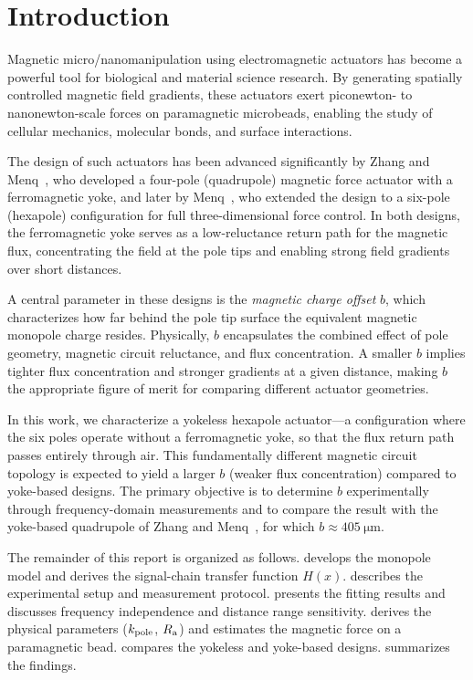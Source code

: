 \section{Introduction}
\label{sec:introduction}

Magnetic micro/nanomanipulation using electromagnetic actuators has become
a powerful tool for biological and material science research. By generating
spatially controlled magnetic field gradients, these actuators exert piconewton-
to nanonewton-scale forces on paramagnetic microbeads, enabling the study of
cellular mechanics, molecular bonds, and surface interactions.

The design of such actuators has been advanced significantly by
Zhang and Menq~\cite{Zhang2010}, who developed a four-pole (quadrupole)
magnetic force actuator with a ferromagnetic yoke, and later by
Menq~\cite{Menq2011}, who extended the design to a six-pole (hexapole)
configuration for full three-dimensional force control. In both designs,
the ferromagnetic yoke serves as a low-reluctance return path for the
magnetic flux, concentrating the field at the pole tips and enabling
strong field gradients over short distances.

A central parameter in these designs is the \emph{magnetic charge offset}
$b$, which characterizes how far behind the pole tip surface the equivalent
magnetic monopole charge resides. Physically, $b$ encapsulates the combined
effect of pole geometry, magnetic circuit reluctance, and flux concentration.
A smaller $b$ implies tighter flux concentration and stronger gradients at a
given distance, making $b$ the appropriate figure of merit for comparing
different actuator geometries.

In this work, we characterize a yokeless hexapole actuator---a configuration
where the six poles operate without a ferromagnetic yoke, so that the flux
return path passes entirely through air. This fundamentally different magnetic
circuit topology is expected to yield a larger $b$ (weaker flux concentration)
compared to yoke-based designs. The primary objective is to determine $b$
experimentally through frequency-domain measurements and to compare the
result with the yoke-based quadrupole of Zhang and Menq~\cite{Zhang2010},
for which $b \approx \SI{405}{\um}$.

The remainder of this report is organized as follows.
 develops the monopole model and derives the
signal-chain transfer function $H(x)$.
 describes the experimental setup and measurement protocol.
 presents the fitting results and discusses frequency
independence and distance range sensitivity.
 derives the physical parameters ($k_\mathrm{pole}$, $R_\mathrm{a}$) and
estimates the magnetic force on a paramagnetic bead.
 compares the yokeless and yoke-based designs.
 summarizes the findings.
